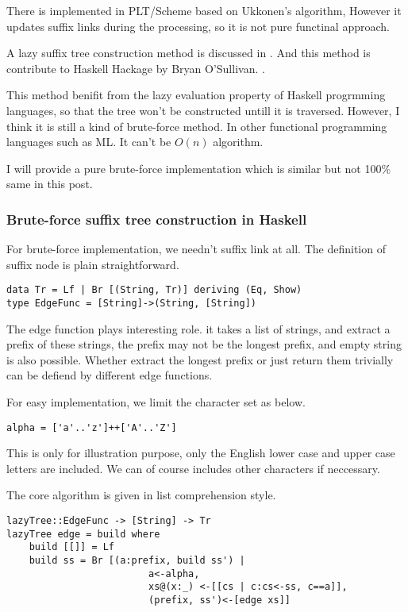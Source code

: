 \documentclass{article}
\begin{document}
There is implemented in PLT/Scheme\cite{plt-stree} based on
Ukkonen's algorithm, However it updates suffix links during the 
processing, so it is not pure functinal approach.

A lazy suffix tree construction method is discussed in \cite{GieKur95}.
And this method is contribute to Haskell Hackage by Bryan O'Sullivan.
\cite{Hackage-STree}.

This method benifit from the lazy evaluation property of 
Haskell progrmming languages, so that the tree won't be constructed
untill it is traversed. However, I think it is still a kind of brute-force
method. In other functional programming languages such as ML.
It can't be $O(n)$ algorithm.

I will provide a pure brute-force implementation which is similar
but not 100\% same in this post.

\subsubsection*{Brute-force suffix tree construction in Haskell}

For brute-force implementation, we needn't suffix link at all. The definition
of suffix node is plain straightforward.

\lstset{language=Haskell}
\begin{lstlisting}
data Tr = Lf | Br [(String, Tr)] deriving (Eq, Show)
type EdgeFunc = [String]->(String, [String])
\end{lstlisting}

The edge function plays interesting role. it takes a list of strings,
and extract a prefix of these strings, the prefix may not be the
longest prefix, and empty string is also possible. Whether extract
the longest prefix or just return them trivially can be defiend by different
edge functions.

For easy implementation, we limit the character set as below.

\begin{lstlisting}
alpha = ['a'..'z']++['A'..'Z']
\end{lstlisting}

This is only for illustration purpose, only the English lower case and upper
case letters are included. We can of course includes other characters if neccessary.

The core algorithm is given in list comprehension style.

\begin{lstlisting}
lazyTree::EdgeFunc -> [String] -> Tr
lazyTree edge = build where
    build [[]] = Lf
    build ss = Br [(a:prefix, build ss') | 
                         a<-alpha, 
                         xs@(x:_) <-[[cs | c:cs<-ss, c==a]],
                         (prefix, ss')<-[edge xs]]
\end{lstlisting}
\end{document}
